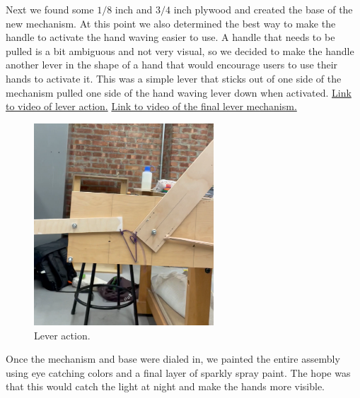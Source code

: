 \documentclass[11pt]{report}
\begin{document}
Next we found some $1/8$ inch and $3/4$ inch plywood and created the base of the new mechanism. At this point we also determined the best way to make the handle to activate the hand waving easier to use. A handle that needs to be pulled is a bit ambiguous and not very visual, so we decided to make the handle another lever in the shape of a hand that would encourage users to use their hands to activate it. This was a simple lever that sticks out of one side of the mechanism pulled one side of the hand waving lever down when activated. \href{https://drive.google.com/file/d/1A4jMRefTUcI-PZPhbS6XSqFU6V4kzS8j/view?usp=sharing}{Link to video of lever action.}  \href{https://drive.google.com/file/d/1zZMAdPojSRc_iC_QfIq4iEV6bjWMPP37/view?usp=sharing}{Link to video of the final lever mechanism.}

\begin{figure}[ht!]
\centering
\includegraphics[width=0.6\textwidth]{"images/III/leverswithbase.png"}
\caption{Lever action.}
\end{figure}

Once the mechanism and base were dialed in, we painted the entire assembly using eye catching colors and a final layer of sparkly spray paint. The hope was that this would catch the light at night and make the hands more visible.
\end{document}
